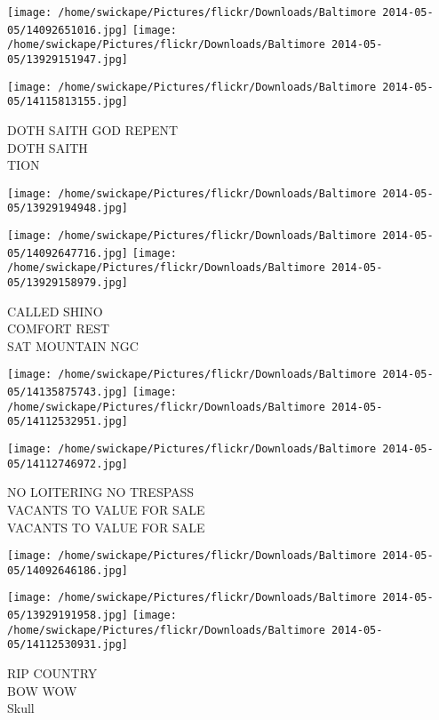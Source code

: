 \documentclass[10pt,letterpaper]{article}
\begin{document}
\texttt{[image: /home/swickape/Pictures/flickr/Downloads/Baltimore 2014-05-05/14092651016.jpg]}
\texttt{[image: /home/swickape/Pictures/flickr/Downloads/Baltimore 2014-05-05/13929151947.jpg]}

\texttt{[image: /home/swickape/Pictures/flickr/Downloads/Baltimore 2014-05-05/14115813155.jpg]}

DOTH SAITH GOD REPENT\\
DOTH SAITH\\
TION\\
\pagebreak

\texttt{[image: /home/swickape/Pictures/flickr/Downloads/Baltimore 2014-05-05/13929194948.jpg]}

\vspace{0.25in}
\texttt{[image: /home/swickape/Pictures/flickr/Downloads/Baltimore 2014-05-05/14092647716.jpg]}
\texttt{[image: /home/swickape/Pictures/flickr/Downloads/Baltimore 2014-05-05/13929158979.jpg]}

CALLED SHINO\\
COMFORT REST\\
SAT MOUNTAIN NGC\\
\pagebreak

\texttt{[image: /home/swickape/Pictures/flickr/Downloads/Baltimore 2014-05-05/14135875743.jpg]}
\texttt{[image: /home/swickape/Pictures/flickr/Downloads/Baltimore 2014-05-05/14112532951.jpg]}

\texttt{[image: /home/swickape/Pictures/flickr/Downloads/Baltimore 2014-05-05/14112746972.jpg]}

NO LOITERING NO TRESPASS\\
VACANTS TO VALUE FOR SALE\\
VACANTS TO VALUE FOR SALE\\
\pagebreak

\texttt{[image: /home/swickape/Pictures/flickr/Downloads/Baltimore 2014-05-05/14092646186.jpg]}

\vspace{0.25in}
\texttt{[image: /home/swickape/Pictures/flickr/Downloads/Baltimore 2014-05-05/13929191958.jpg]}
\texttt{[image: /home/swickape/Pictures/flickr/Downloads/Baltimore 2014-05-05/14112530931.jpg]}

RIP COUNTRY\\
BOW WOW\\
Skull\\
\pagebreak
\end{document}
